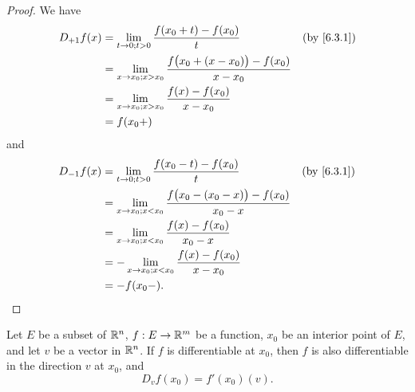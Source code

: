 \begin{proof}
  We have
  \begin{align*}
    D_{+1} f(x) & = \lim_{t \to 0 ; t > 0} \dfrac{f(x_0 + t) - f(x_0)}{t}                           &  & \by{6.3.1} \\
                & = \lim_{x \to x_0 ; x > x_0} \dfrac{f\big(x_0 + (x - x_0)\big) - f(x_0)}{x - x_0}                 \\
                & = \lim_{x \to x_0 ; x > x_0} \dfrac{f(x) - f(x_0)}{x - x_0}                                       \\
                & = f(x_0+)
  \end{align*}
  and
  \begin{align*}
    D_{-1} f(x) & = \lim_{t \to 0 ; t > 0} \dfrac{f(x_0 - t) - f(x_0)}{t}                           &  & \by{6.3.1} \\
                & = \lim_{x \to x_0 ; x < x_0} \dfrac{f\big(x_0 - (x_0 - x)\big) - f(x_0)}{x_0 - x}                 \\
                & = \lim_{x \to x_0 ; x < x_0} \dfrac{f(x) - f(x_0)}{x_0 - x}                                       \\
                & = -\lim_{x \to x_0 ; x < x_0} \dfrac{f(x) - f(x_0)}{x - x_0}                                      \\
                & = -f(x_0-).
  \end{align*}
\end{proof}

\setcounter{thm}{4}
\begin{lem}\label{6.3.5}
  Let \(E\) be a subset of \(\mathbb{R}^n\), \(f : E \to \mathbb{R}^m\) be a function, \(x_0\) be an interior point of \(E\), and let \(v\) be a vector in \(\mathbb{R}^n\).
  If \(f\) is differentiable at \(x_0\), then \(f\) is also differentiable in the direction \(v\) at \(x_0\), and
  \[
    D_v f(x_0) = f'(x_0)(v).
  \]
\end{lem}

